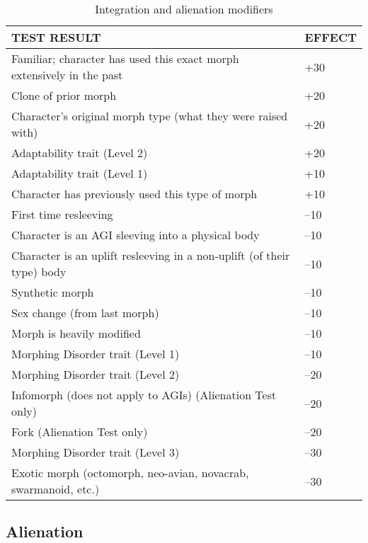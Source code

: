 \begin{table}
\caption{Integration and alienation modifiers}
\begin{tabular}{|l|l|}
\hline
TEST RESULT & EFFECT \\
\hline
Familiar; character has used this exact morph extensively in the past & +30 \\
\hline
Clone of prior morph & +20 \\
\hline
Character’s original morph type (what they were raised with) & +20 \\
\hline
Adaptability trait (Level 2) & +20 \\
\hline
Adaptability trait (Level 1) & +10 \\
\hline
Character has previously used this type of morph & +10 \\
\hline
First time resleeving & –10 \\
\hline
Character is an AGI sleeving into a physical body & –10 \\
\hline
Character is an uplift resleeving in a non-uplift (of their type) body & –10 \\
\hline
Synthetic morph & –10 \\
\hline
Sex change (from last morph) & –10 \\
\hline
Morph is heavily modified & –10 \\
\hline
Morphing Disorder trait (Level 1) & –10 \\
\hline
Morphing Disorder trait (Level 2) & –20 \\
\hline
Infomorph (does not apply to AGIs) (Alienation Test only) & –20 \\
\hline
Fork (Alienation Test only) & –20 \\
\hline
Morphing Disorder trait (Level 3) & –30 \\
\hline
Exotic morph (octomorph, neo-avian, novacrab, swarmanoid, etc.) & –30 \\
\hline
\end{tabular}
\end{table}

\subsection{Alienation}

